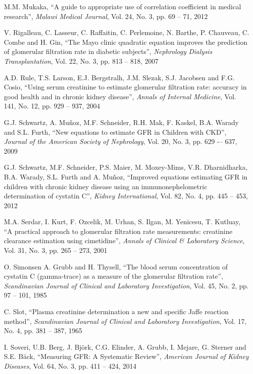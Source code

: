 \documentclass[10pt,final]{siamltex}
\begin{document}
\begin{thebibliography}{99}
   M.M. Mukaka, ``A guide to appropriate use of correlation coefficient in medical research'', \textit{Malawi Medical Journal}, Vol. 24, No. 3, pp. 69 -- 71, 2012

   V. Rigalleau, C. Lasseur, C. Raffaitin, C. Perlemoine, N. Barthe, P. Chauveau, C. Combe and H. Gin, ``The Mayo clinic quadratic equation improves the prediction of glomerular filtration rate in diabetic subjects'', \textit{Nephrology Dialysis Transplantation}, Vol. 22, No. 3, pp. 813 -- 818, 2007

   A.D. Rule, T.S. Larson, E.J. Bergstralh, J.M. Slezak, S.J. Jacobsen and F.G. Cosio, ``Using serum creatinine to estimate glomerular filtration rate: accuracy in good health and in chronic kidney disease'', \textit{Annals of Internal Medicine}, Vol. 141, No. 12, pp. 929 -- 937, 2004

   G.J. Schwartz, A. Mu\~{n}oz, M.F. Schneider, R.H. Mak, F. Kaskel, B.A. Warady and S.L. Furth, ``New equations to estimate GFR in Children with CKD'', \textit{Journal of the American Society of Nephrology}, Vol. 20, No. 3, pp. 629 -– 637, 2009

   G.J. Schwartz, M.F. Schneider, P.S. Maier, M. Moxey-Mims, V.R. Dharnidharka, B.A. Warady, S.L. Furth and A. Mu\~{n}oz, ``Improved equations estimating GFR in children with chronic kidney disease using an immunonephelometric determination of cystatin C'', \textit{Kidney International}, Vol. 82, No. 4, pp. 445 -- 453, 2012

   M.A. Serdar, I. Kurt, F. Ozcelik, M. Urhan, S. Ilgan, M. Yenicesu, T. Kutluay, ``A practical approach to glomerular filtration rate measurements: creatinine clearance estimation using cimetidine'', \textit{Annals of Clinical \& Laboratory Science}, Vol. 31, No. 3, pp. 265 -- 273, 2001

   O. Simonsen A. Grubb and H. Thysell, ``The blood serum concentration of cystatin C (gamma-trace) as a measure of the glomerular filtration rate'', \textit{Scandinavian Journal of Clinical and Laboratory Investigation}, Vol. 45, No. 2, pp. 97 -- 101, 1985

   C. Slot, ``Plasma creatinine determination a new and specific Jaffe reaction method'', \textit{Scandinavian Journal of Clinical and Laboratory Investigation}, Vol. 17, No. 4, pp. 381 -- 387, 1965

   I. Soveri, U.B. Berg, J. Bj\"{o}rk, C.G. Elinder, A. Grubb, I. Mejare, G. Sterner and S.E. B\"{a}ck, ``Measuring GFR: A Systematic Review'', \textit{American Journal of Kidney Diseases}, Vol. 64, No. 3, pp. 411 -- 424, 2014


\end{thebibliography}
\end{document}
